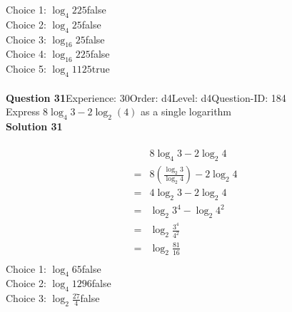 \documentclass{article}
\begin{document}
Choice 1: \hspace{20pt}$\log_{4}225$\hspace{20pt}false\\
Choice 2: \hspace{20pt}$\log_{4}25$\hspace{20pt}false\\
Choice 3: \hspace{20pt}$\log_{16}25$\hspace{20pt}false\\
Choice 4: \hspace{20pt}$\log_{16}225$\hspace{20pt}false\\
Choice 5: \hspace{20pt}$\log_{4}1125$\hspace{20pt}true\\
\\[4pt]
\noindent\textbf{Question 31}\hspace{20pt}Experience: 30\hspace{20pt}Order: d4\hspace{20pt}Level: d4\hspace{20pt}Question-ID: 184\\[2pt]
Express $8\log_{4}3-2\log_{2}(4)$ as a single logarithm\\[4pt]
\noindent\textbf{Solution 31}\\[2pt]
\\[-35pt]\begin{align*}
&8\log_{4}3-2\log_{2}4\\[2pt]
=&8\left(\displaystyle\frac{\log_{2}3}{\log_{2}4}\right)-2\log_{2}4\\[2pt]
=&4\log_{2}3-2\log_{2}4\\[2pt]
=&\log_{2}3^4-\log_{2}4^2\\[2pt]
=&\log_{2}\displaystyle\frac{3^4}{4^2}\\[2pt]
=&\log_{2}\displaystyle\frac{81}{16}\\[-87pt]
\end{align*}
Choice 1: \hspace{20pt}$\log_{4}65$\hspace{20pt}false\\
Choice 2: \hspace{20pt}$\log_{4}1296$\hspace{20pt}false\\
Choice 3: \hspace{20pt}$\log_{2}\displaystyle\frac{27}{4}$\hspace{20pt}false\\
\end{document}
